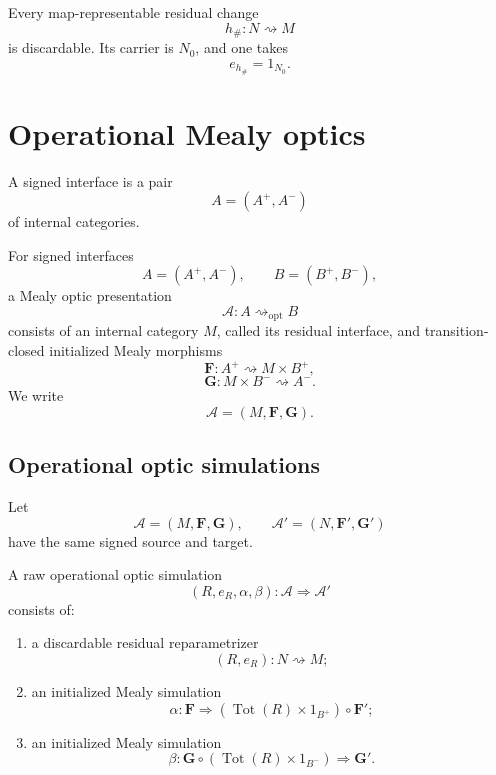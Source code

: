 Every map-representable residual change
\[
  h_\#:N\rightsquigarrow M
\]
is discardable. Its carrier is \(N_0\), and one takes
\[
  e_{h_\#}=1_{N_0}.
\]

\section{Operational Mealy optics}
\label{sec:operational-mealy-optics}

\begin{definition}
\label{def:signed-interface}
A signed interface is a pair
\[
  A=(A^+,A^-)
\]
of internal categories.
\end{definition}

\begin{definition}
\label{def:mealy-optic-presentation}
For signed interfaces
\[
  A=(A^+,A^-),
  \qquad
  B=(B^+,B^-),
\]
a Mealy optic presentation
\[
  \mathcal A:A\rightsquigarrow_{\mathrm{opt}}B
\]
consists of an internal category \(M\), called its residual interface, and transition-closed
initialized Mealy morphisms
\[
  \mathbf F:A^+\rightsquigarrow M\times B^+,
\]
\[
  \mathbf G:M\times B^-\rightsquigarrow A^-.
\]
We write
\[
  \mathcal A=(M,\mathbf F,\mathbf G).
\]
\end{definition}

\subsection{Operational optic simulations}

Let
\[
  \mathcal A=(M,\mathbf F,\mathbf G),
  \qquad
  \mathcal A'=(N,\mathbf F',\mathbf G')
\]
have the same signed source and target.

\begin{definition}
\label{def:raw-operational-optic-simulation}
A raw operational optic simulation
\[
  (R,e_R,\alpha,\beta):
  \mathcal A\Longrightarrow\mathcal A'
\]
consists of:
\begin{enumerate}
  \item a discardable residual reparametrizer
  \[
    (R,e_R):N\rightsquigarrow M;
  \]
  \item an initialized Mealy simulation
  \[
    \alpha:
    \mathbf F
    \Longrightarrow
    (\operatorname{Tot}(R)\times1_{B^+})\circ\mathbf F';
  \]
  \item an initialized Mealy simulation
  \[
    \beta:
    \mathbf G\circ(\operatorname{Tot}(R)\times1_{B^-})
    \Longrightarrow
    \mathbf G'.
  \]
\end{enumerate}
\end{definition}


